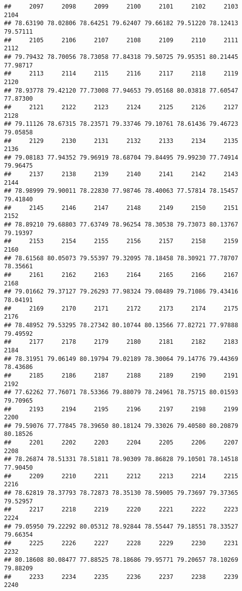 \documentclass[
]{article}
\begin{document}
\begin{verbatim}
##     2097     2098     2099     2100     2101     2102     2103     2104 
## 78.63190 78.02806 78.64251 79.62407 79.66182 79.51220 78.12413 79.57111 
##     2105     2106     2107     2108     2109     2110     2111     2112 
## 79.79432 78.70056 78.73058 77.84318 79.50725 79.95351 80.21445 77.98717 
##     2113     2114     2115     2116     2117     2118     2119     2120 
## 78.93778 79.42120 77.73008 77.94653 79.05168 80.03818 77.60547 77.87300 
##     2121     2122     2123     2124     2125     2126     2127     2128 
## 79.11126 78.67315 78.23571 79.33746 79.10761 78.61436 79.46723 79.05858 
##     2129     2130     2131     2132     2133     2134     2135     2136 
## 79.08183 77.94352 79.96919 78.68704 79.84495 79.99230 77.74914 79.96475 
##     2137     2138     2139     2140     2141     2142     2143     2144 
## 78.98999 79.90011 78.22830 77.98746 78.40063 77.57814 78.15457 79.41840 
##     2145     2146     2147     2148     2149     2150     2151     2152 
## 78.89210 79.68803 77.63749 78.96254 78.30538 79.73073 80.13767 79.19397 
##     2153     2154     2155     2156     2157     2158     2159     2160 
## 78.61568 80.05073 79.55397 79.32095 78.18458 78.30921 77.78707 78.35661 
##     2161     2162     2163     2164     2165     2166     2167     2168 
## 79.01662 79.37127 79.26293 77.98324 79.08489 79.71086 79.43416 78.04191 
##     2169     2170     2171     2172     2173     2174     2175     2176 
## 78.48952 79.53295 78.27342 80.10744 80.13566 77.82721 77.97888 79.49592 
##     2177     2178     2179     2180     2181     2182     2183     2184 
## 78.31951 79.06149 80.19794 79.02189 78.30064 79.14776 79.44369 78.43686 
##     2185     2186     2187     2188     2189     2190     2191     2192 
## 77.62262 77.76071 78.53366 79.88079 78.24961 78.75715 80.01593 79.70965 
##     2193     2194     2195     2196     2197     2198     2199     2200 
## 79.59076 77.77845 78.39650 80.18124 79.33026 79.40580 80.20879 80.18526 
##     2201     2202     2203     2204     2205     2206     2207     2208 
## 78.26874 78.51331 78.51811 78.90309 78.86828 79.10501 78.14518 77.90450 
##     2209     2210     2211     2212     2213     2214     2215     2216 
## 78.62819 78.37793 78.72873 78.35130 78.59005 79.73697 79.37365 79.52957 
##     2217     2218     2219     2220     2221     2222     2223     2224 
## 79.05950 79.22292 80.05312 78.92844 78.55447 79.18551 78.33527 79.66354 
##     2225     2226     2227     2228     2229     2230     2231     2232 
## 80.18608 80.08477 77.88525 78.18686 79.95771 79.20657 78.10269 79.88209 
##     2233     2234     2235     2236     2237     2238     2239     2240 

\end{verbatim}
\end{document}
